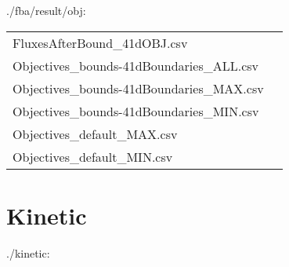 \documentclass[a4paper, parskip=full]{scrreprt}
\begin{document}
./fba/result/obj:

\begin{tabularx}{\linewidth}{LL}
FluxesAfterBound\_41dOBJ.csv\\
Objectives\_bounds-41dBoundaries\_ALL.csv\\
Objectives\_bounds-41dBoundaries\_MAX.csv\\
Objectives\_bounds-41dBoundaries\_MIN.csv\\
Objectives\_default\_MAX.csv\\
Objectives\_default\_MIN.csv
\end{tabularx}

\chapter{Kinetic}
\label{ch:kinetic}

./kinetic:
\end{document}
